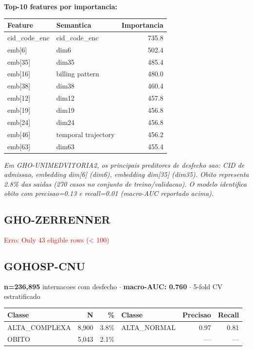 \documentclass[11pt,a4paper]{article}
\begin{document}
\vspace{4pt}\noindent\textbf{Top-10 features por importancia:}

\begin{tabular}{llr}
\toprule
Feature & Semantica & Importancia \\
\midrule
cid\_code\_enc & cid\_code\_enc & 735.8 \\
emb[6] & dim6 & 502.4 \\
emb[35] & dim35 & 485.4 \\
emb[16] & billing pattern & 480.0 \\
emb[38] & dim38 & 460.4 \\
emb[12] & dim12 & 457.8 \\
emb[19] & dim19 & 456.8 \\
emb[24] & dim24 & 456.8 \\
emb[46] & temporal trajectory & 456.2 \\
emb[63] & dim63 & 455.4 \\
\bottomrule
\end{tabular}

\vspace{4pt}\noindent\textit{Em GHO-UNIMEDVITORIA2, os principais preditores de desfecho sao: CID de admissao, embedding dim[6] (dim6), embedding dim[35] (dim35). Obito representa 2.8\% das saidas (270 casos no conjunto de treino/validacao). O modelo identifica obito com precisao=0.13 e recall=0.01 (macro-AUC reportado acima).}

\subsection{GHO-ZERRENNER}
\textcolor{red}{Erro: Only 43 eligible rows (< 100)}

\subsection{GOHOSP-CNU}
\textbf{n=236,895} internacoes com desfecho $\cdot$ \textbf{macro-AUC: 0.760} $\cdot$ 5-fold CV estratificado

\begin{tabular}{lrr|lrr}
\toprule
Classe & N & \% & Classe & Precisao & Recall \\
\midrule
ALTA\_COMPLEXA & 8,900 & 3.8\% & ALTA\_NORMAL & 0.97 & 0.81 \\
OBITO & 5,043 & 2.1\% &  & --- & --- \\
\bottomrule
\end{tabular}
\end{document}
